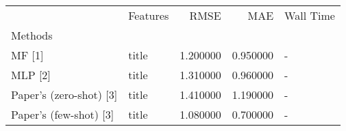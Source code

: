 \begin{tabular}{llrrl}
 & Features & RMSE & MAE & Wall Time \\
Methods &  &  &  &  \\
MF [1] & title & 1.200000 & 0.950000 & - \\
MLP [2] & title & 1.310000 & 0.960000 & - \\
Paper's (zero-shot) [3] & title & 1.410000 & 1.190000 & - \\
Paper's (few-shot) [3] & title & 1.080000 & 0.700000 & - \\
\end{tabular}
